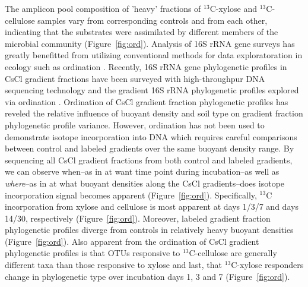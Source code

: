 The amplicon pool composition of 'heavy'
fractions of $^{13}$C-xylose and $^{13}$C-cellulose samples vary from
corresponding controls and from each other, indicating that the substrates were
assimilated by different members of the  microbial community
(Figure~\ref{fig:ord}).  Analysis of 16S rRNA gene surveys has greatly
benefitted from utilizing conventional methods for data exploratoration in
ecology such as ordination \citep{Lozupone_2008}.  Recently, 16S rRNA gene
phylogenetic profiles in CsCl gradient fractions have been surveyed with
high-throughpur DNA sequencing technology and the gradient 16S rRNA
phylogenetic profiles explored via ordination \citep{Angel_2013,
Verastegui_2014}. Ordination of CsCl gradient fraction phylogenetic profiles
has reveled the relative influence of buoyant density and soil type on gradient
fraction phylogenetic profile variance. However, ordination has not been used
to demonstrate isotope incorporation into DNA which requires careful
comparisons between control and labeled gradients over the same buoyant density
range. By sequencing all CsCl gradient fractions from both control and labeled
gradients, we can observe when--as in at want time point during incubation--as
well as \textit{where}--as in at what buoyant densities along the CsCl
gradients--does isotope incorporation signal becomes apparent
(Figure~\ref{fig:ord}). Specifically, $^{13}$C incorporation from xylose and
cellulose is most apparent at days 1/3/7 and days 14/30, respectively
(Figure~\ref{fig:ord}). Moreover, labeled gradient fraction phylogenetic
profiles diverge from controls in relatively heavy buoyant densities
(Figure~\ref{fig:ord}). Also apparent from the ordination of CsCl gradient
phylogenetic profiles is that OTUs responsive to $^{13}$C-cellulose are
generally different taxa than those responsive to xylose and last, that
$^{13}$C-xylose responders change in phylogenetic type over incubation days 1,
3 and 7 (Figure~\ref{fig:ord}).

